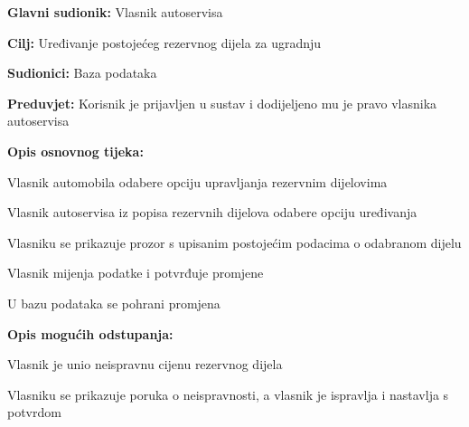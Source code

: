 					\noindent {}
					\begin{packed_item}
						
						\item \textbf{Glavni sudionik: } Vlasnik autoservisa
						\item  \textbf{Cilj:} Uređivanje postojećeg rezervnog dijela za ugradnju
						\item  \textbf{Sudionici:} Baza podataka
						\item  \textbf{Preduvjet:} Korisnik je prijavljen u sustav i dodijeljeno mu je pravo vlasnika autoservisa
						\item  \textbf{Opis osnovnog tijeka:}
						
						\item[] \begin{packed_enum}
							
							\item Vlasnik automobila odabere opciju upravljanja rezervnim dijelovima
							\item Vlasnik autoservisa iz popisa rezervnih dijelova odabere opciju uređivanja
							\item Vlasniku se prikazuje prozor s upisanim postojećim podacima o odabranom dijelu
							\item Vlasnik mijenja podatke i potvrđuje promjene
							\item U bazu podataka se pohrani promjena 
							
						\end{packed_enum}
						
						\item  \textbf{Opis mogućih odstupanja:}
						\item[] \begin{packed_item}
							\item[4.a] Vlasnik je unio neispravnu cijenu rezervnog dijela
							\item[] \begin{packed_enum}
								\item Vlasniku se prikazuje poruka o neispravnosti, a vlasnik je ispravlja i nastavlja s potvrdom
							\end{packed_enum}
						\end{packed_item}
						
					\end{packed_item}
					

